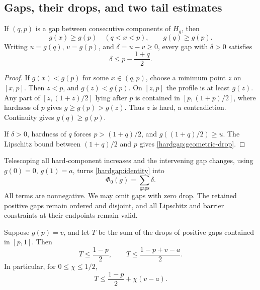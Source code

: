 \subsection{Gaps, their drops, and two tail estimates}
\label{hardgap:geometry}

\begin{lemma}\label{hardgap:gap}
If \((q,p)\) is a gap between consecutive components of \(H_g\), then
\[
 g(x)\ge g(p)\quad(q<x<p),\qquad g(q)\ge g(p).
\]
Writing \(u=g(q)\), \(v=g(p)\), and \(\delta=u-v\ge0\),
every gap with \(\delta>0\) satisfies
\begin{equation}\label{hardgap:geometric-drop}
 \delta\le p-\frac{1+q}{2}.
\end{equation}
\end{lemma}

\begin{proof}
If \(g(x)<g(p)\) for some \(x\in(q,p)\), choose a minimum point
\(z\) on \([x,p]\). Then \(z<p\), and \(g(z)<g(p)\).
On \([z,p]\) the profile is at least \(g(z)\). Any part of
\([z,(1+z)/2]\) lying after \(p\) is contained in
\([p,(1+p)/2]\), where hardness of \(p\) gives
\(g\ge g(p)>g(z)\). Thus \(z\) is hard, a contradiction.
Continuity gives \(g(q)\ge g(p)\).

If \(\delta>0\), hardness of \(q\) forces
\(p>(1+q)/2\), and \(g((1+q)/2)\ge u\). The Lipschitz
bound between \((1+q)/2\) and \(p\) gives
\eqref{hardgap:geometric-drop}.
\end{proof}

Telescoping all hard-component increases and the intervening gap changes,
using \(g(0)=0\), \(g(1)=a\), turns \eqref{hardgap:identity} into
\begin{equation}\label{hardgap:drop-sum}
 \Phi_0(g)=\sum_{\text{gaps}}\delta.
\end{equation}
All terms are nonnegative. We may omit gaps with zero drop. The retained
positive gaps remain ordered and disjoint, and all Lipschitz and barrier
constraints at their endpoints remain valid.

\begin{lemma}\label{hardgap:tail}
Suppose \(g(p)=v\), and let \(T\) be the sum of the drops of
positive gaps contained in \([p,1]\). Then
\begin{equation}\label{hardgap:tails}
 T\le\frac{1-p}{2},\qquad
 T\le\frac{1-p+v-a}{2}.
\end{equation}
In particular, for \(0\le\chi\le1/2\),
\begin{equation}\label{hardgap:blended-tail}
 T\le\frac{1-p}{2}+\chi(v-a).
\end{equation}
\end{lemma}

